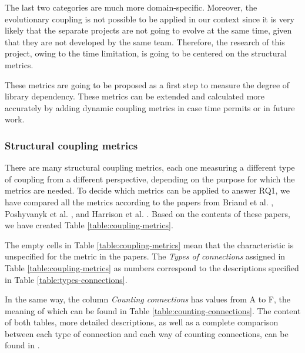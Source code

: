 \bigskip\noindent
The last two categories are much more domain-specific. Moreover, the evolutionary coupling is not possible to be applied in our context since it is very likely that the separate projects are not going to evolve at the same time, given that they are not developed by the same team. Therefore, the research of this project, owing to the time limitation, is going to be centered on the structural metrics.

These metrics are going to be proposed as a first step to measure the degree of library dependency. These metrics can be extended and calculated more accurately by adding dynamic coupling metrics in case time permits or in future work.

\subsubsection{Structural coupling metrics}
There are many structural coupling metrics, each one measuring a different type of coupling from a different perspective, depending on the purpose for which the metrics are needed.
To decide which metrics can be applied to answer RQ1, we have compared all the metrics according to the papers from Briand et al. \cite{briand1999unified}, Poshyvanyk et al. \cite{poshyvanyk2006conceptual}, and Harrison et al. \cite{harrison1998coupling}. Based on the contents of these papers, we have created Table \ref{table:coupling-metrics}.

The empty cells in Table \ref{table:coupling-metrics} mean that the characteristic is unspecified for the metric in the papers. The \textit{Types of connections} assigned in Table \ref{table:coupling-metrics} as numbers correspond to the descriptions specified in Table \ref{table:types-connections}.

In the same way, the column \textit{Counting connections} has values from A to F, the meaning of which can be found in Table \ref{table:counting-connections}.
The content of both tables, more detailed descriptions, as well as a complete comparison between each type of connection and each way of counting connections, can be found in \cite{briand1999unified}.

